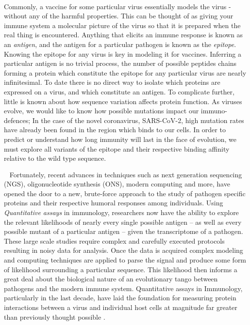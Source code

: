 \documentclass{article}
\begin{document}
~

Commonly, a vaccine for some particular virus essentially models the virus - without any of the harmful properties.
This can be thought of as giving your immune system a molecular picture of the virus so that it is prepared when the real thing is encountered.
Anything that elicits an immune response is known as an \textit{antigen}, and the antigen for a particular pathogen is known as the \textit{epitope}.
Knowing the epitope for any virus is key in modeling it for vaccines.
Inferring a particular antigen is no trivial process, the number of possible peptides chains forming a protein
which constitute the epitope for any particular virus are nearly infinitesimal.
To date there is no direct way to isolate which proteins are expressed on a virus, and which constitute an antigen.
To complicate further, little is known about how sequence variation affects protein function.
As viruses evolve, we would like to know how possible mutations impact our immuno-defences; 
In the case of the novel coronavirus, SARS-CoV-2, high mutation rates have already been found in the region which binds to our cells.
In order to predict or understand how long immunity will last in the face of evolution, we must explore all variants of the epitope
and their respective binding affinity relative to the wild type sequence.

~
Fortunately, recent advances in techniques such as next generation sequencing (NGS), oligonucleotide synthesis (ONS), modern computing and more,
have opened the door to a new, brute-force approach to the study of pathogen specific proteins and their respective humoral responses among individuals.
Using \textit{Quantitative assays} in immunology, researchers now have the ability to explore the relevant likelihoods of nearly every single 
possible antigen -- as well as every possible mutant of a particular antigen -- given the transcriptome of a pathogen.
These large scale studies require complex and carefully executed protocols resulting in noisy data for analysis.
Once the data is acquired complex modeling and computing techniques are applied to parse the signal and produce some form of likelihood surrounding a particular sequence.
This likelihood then informs a great deal about the biological nature of an evolutionary tango between pathogens and the modern immune system.
Quantitative assays in Immunology, particularly in the last decade, have laid the foundation for measuring protein interactions 
between a virus and individual host cells at magnitude far
greater than previously thought possible \citep{Fowler2014, Bloom2014}.
\end{document}
